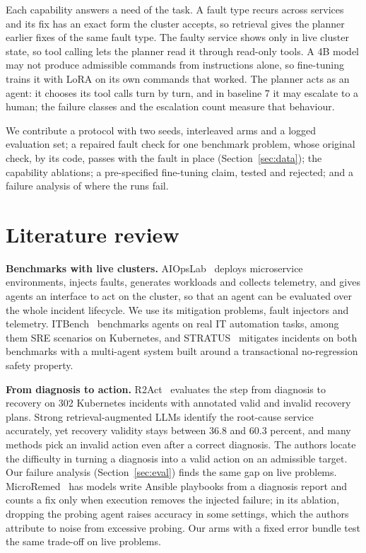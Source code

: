\documentclass[10pt,conference]{IEEEtran}
\begin{document}
Each capability answers a need of the task. A fault type recurs across services and its fix has an
exact form the cluster accepts, so retrieval gives the planner earlier fixes of the same fault type.
The faulty service shows only in live cluster state, so tool calling lets the planner read it
through read-only tools. A 4B model may not produce admissible commands from instructions alone, so
fine-tuning trains it with LoRA on its own commands that worked. The planner acts as an agent: it
chooses its tool calls turn by turn, and in baseline 7 it may escalate to a human; the failure
classes and the escalation count measure that behaviour.

We contribute a protocol with two seeds, interleaved arms and a logged evaluation set; a repaired
fault check for one benchmark problem, whose original check, by its code, passes with the fault in
place (Section~\ref{sec:data}); the
capability ablations; a pre-specified fine-tuning claim, tested and rejected; and a failure
analysis of where the runs fail.

\section{Literature review}

\textbf{Benchmarks with live clusters.} AIOpsLab~\cite{aiopslab} deploys microservice
environments, injects faults, generates workloads and collects telemetry, and gives agents an
interface to act on the cluster, so that an agent can be evaluated over the whole incident
lifecycle. We use its mitigation problems, fault injectors and telemetry. ITBench~\cite{itbench}
benchmarks agents on real IT automation tasks, among them SRE scenarios on Kubernetes, and
STRATUS~\cite{stratus} mitigates incidents on both benchmarks with a multi-agent system built
around a transactional no-regression safety property.

\textbf{From diagnosis to action.} R2Act~\cite{r2act} evaluates the step from diagnosis to
recovery on 302 Kubernetes incidents with annotated valid and invalid recovery plans. Strong
retrieval-augmented LLMs identify the root-cause service accurately, yet recovery validity stays
between 36.8 and 60.3 percent, and many methods pick an invalid action even after a correct
diagnosis. The authors locate the difficulty in turning a diagnosis into a valid action on an
admissible target. Our failure analysis (Section~\ref{sec:eval}) finds the same gap on live
problems. MicroRemed~\cite{microremed} has models write Ansible playbooks from a diagnosis report
and counts a fix only when execution removes the injected failure; in its ablation, dropping the
probing agent raises accuracy in some settings, which the authors attribute to noise from excessive
probing. Our arms with a fixed error bundle test the same trade-off on live problems.
\end{document}
